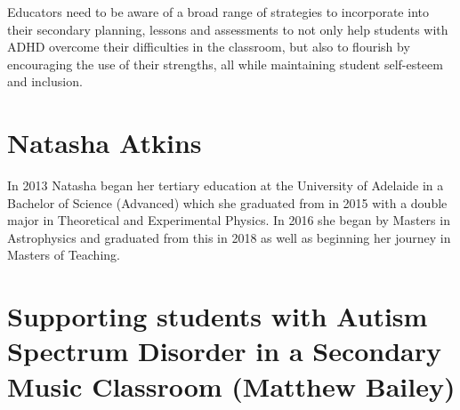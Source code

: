 \documentclass[twoside,14pt,a4paper,notitlepage]{memoir}
\begin{document}
Educators need to be aware of a broad range of strategies to incorporate into their secondary planning, lessons and assessments to not only help students with ADHD overcome their difficulties in the classroom, but also to flourish by encouraging the use of their strengths, all while maintaining student self-esteem and inclusion.

\section*{Natasha Atkins}

In 2013 Natasha began her tertiary education at the University of Adelaide in a Bachelor of Science (Advanced) which she graduated from in 2015 with a double major in Theoretical and Experimental Physics. In 2016 she began by Masters in Astrophysics and graduated from this in 2018 as well as beginning her journey in Masters of Teaching.



\section*{Supporting students with Autism Spectrum Disorder in a Secondary Music Classroom (Matthew Bailey)}
\label{aut:bailey}
\end{document}
